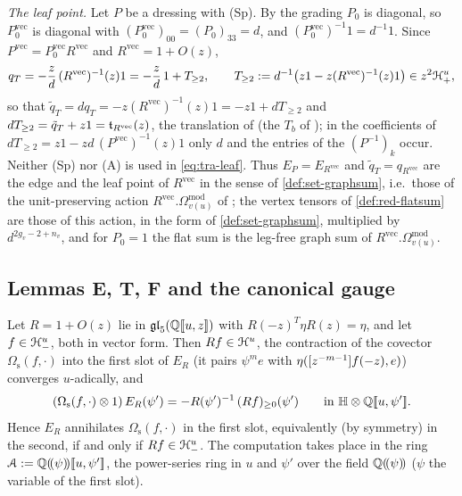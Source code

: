 \emph{The leaf point.} Let $P$ be a dressing with (Sp). By the grading $P_0$ is diagonal, so $P_0^{\mathrm{vec}}$ is diagonal with $(P_0^{\mathrm{vec}})_{00} = (P_0)_{33} = d$, and $(P_0^{\mathrm{vec}})^{-1}1 = d^{-1}1$. Since $P^{\mathrm{vec}} = P_0^{\mathrm{vec}}R^{\mathrm{vec}}$ and $R^{\mathrm{vec}} = 1+O(z)$,
\begin{equation}
\label{eq:tra-leaf}
q_T = -\frac zd\,(R^{\mathrm{vec}})^{-1}(z)1 = -\frac zd\,1+T_{\geq 2},\qquad T_{\geq 2} := d^{-1}\bigl(z1-z(R^{\mathrm{vec}})^{-1}(z)1\bigr)\in z^2\mathcal{H}^u_+ ,
\end{equation}
so that $\tilde q_T = dq_T = -z(R^{\mathrm{vec}})^{-1}(z)1 = -z1+dT_{\geq 2}$ and $dT_{\geq 2} = \tilde q_T+z1 = \mathfrak{t}_{R^{\mathrm{vec}}}(z)$, the translation of \cite[Def.~2.13]{PPZ15} (the $T_b$ of \cite[Prop.~2.12]{PPZ15}); in the coefficients of $dT_{\geq 2} = z1-zd\,(P^{\mathrm{vec}})^{-1}(z)1$ only $d$ and the entries of the $(P^{-1})_k$ occur. Neither (Sp) nor (A) is used in \eqref{eq:tra-leaf}. Thus $E_P = E_{R^{\mathrm{vec}}}$ and $\tilde q_T = q_{R^{\mathrm{vec}}}$ are the edge and the leaf point of $R^{\mathrm{vec}}$ in the sense of \cref{def:set-graphsum}, i.e.\ those of the unit-preserving action $R^{\mathrm{vec}}.\Omega^{\mathrm{mod}}_{v(u)}$ of \cite[Defs.~2.2, 2.13]{PPZ15}; the vertex tensors of \cref{def:red-flatsum} are those of this action, in the form of \cref{def:set-graphsum}, multiplied by $d^{2g_v-2+n_v}$, and for $P_0 = 1$ the flat sum is the leg-free graph sum of $R^{\mathrm{vec}}.\Omega^{\mathrm{mod}}_{v(u)}$.

\subsection{Lemmas E, T, F and the canonical gauge}
\label{sec:tra-lemmas}

\begin{lem}[Lemma E]
\label{lem:tra-E}
Let $R = 1+O(z)$ lie in $\mathfrak{gl}_5(\mathbb{Q}[\![ u,z ]\!])$ with $R(-z)^T\eta R(z) = \eta$, and let $f\in\mathcal{H}^u_-$, both in vector form. Then $Rf\in\mathcal{H}^u$, the contraction of the covector $\Omega_{\mathrm s}(f,\cdot)$ into the first slot of $E_R$ (it pairs $\psi^me$ with $\eta([z^{-m-1}]f(-z),e)$) converges $u$-adically, and
\begin{equation}
\label{eq:tra-lemE}
(\Omega_{\mathrm s}(f,\cdot)\otimes 1)\,E_R(\psi') = -R(\psi')^{-1}\,(Rf)_{\geq 0}(\psi')\qquad\text{in }\mathbb{H}\otimes\mathbb{Q}[\![ u,\psi' ]\!] .
\end{equation}
Hence $E_R$ annihilates $\Omega_{\mathrm s}(f,\cdot)$ in the first slot, equivalently (by symmetry) in the second, if and only if $Rf\in\mathcal{H}^u_-$. The computation takes place in the ring $\mathcal{A} := \mathbb{Q}(\!(\psi)\!)[\![ u,\psi' ]\!]$, the power-series ring in $u$ and $\psi'$ over the field $\mathbb{Q}(\!(\psi)\!)$ ($\psi$ the variable of the first slot).
\end{lem}

